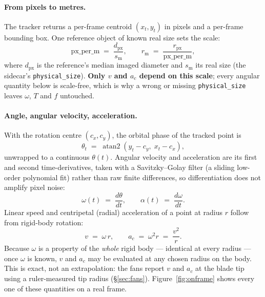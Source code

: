 \documentclass[11pt,a4paper]{article}
\begin{document}
\paragraph{From pixels to metres.} The tracker returns a per-frame centroid $(x_t, y_t)$ in
pixels and a per-frame bounding box. One reference object of known real size sets the scale:
\begin{equation}
\mathrm{px\_per\_m} \;=\; \frac{d_{\mathrm{px}}}{s_{\mathrm{m}}},
\qquad
r_{\mathrm{m}} \;=\; \frac{r_{\mathrm{px}}}{\mathrm{px\_per\_m}},
\label{eq:calib}
\end{equation}
where $d_{\mathrm{px}}$ is the reference's median imaged diameter and $s_{\mathrm{m}}$ its real
size (the sidecar's \texttt{physical\_size}). \textbf{Only $v$ and $a_c$ depend
on this scale}; every angular quantity below is scale-free, which is why a wrong or missing
\texttt{physical\_size} leaves $\omega$, $T$ and $f$ untouched.

\paragraph{Angle, angular velocity, acceleration.} With the rotation centre $(c_x, c_y)$, the
orbital phase of the tracked point is
\begin{equation}
\theta_t \;=\; \operatorname{atan2}\!\left(y_t - c_y,\; x_t - c_x\right),
\end{equation}
unwrapped to a continuous $\theta(t)$. Angular velocity and acceleration are its first and second
time-derivatives, taken with a Savitzky--Golay filter (a sliding low-order polynomial fit) rather
than raw finite differences, so differentiation does not amplify pixel noise:
\begin{equation}
\omega(t) \;=\; \frac{d\theta}{dt}, \qquad \alpha(t) \;=\; \frac{d\omega}{dt}.
\end{equation}
Linear speed and centripetal (radial) acceleration of a point at radius $r$ follow from
rigid-body rotation:
\begin{equation}
v \;=\; \omega\, r, \qquad a_c \;=\; \omega^{2} r \;=\; \frac{v^{2}}{r}.
\label{eq:vac}
\end{equation}
Because $\omega$ is a property of the \emph{whole} rigid body --- identical at every radius --- once
$\omega$ is known, $v$ and $a_c$ may be evaluated at any chosen radius on the body. This is exact,
not an extrapolation: the fans report $v$ and $a_c$ at the blade tip using a ruler-measured tip
radius (\S\ref{sec:fans}). Figure~\ref{fig:onframe} shows every one of these quantities on a real
frame.
\end{document}
